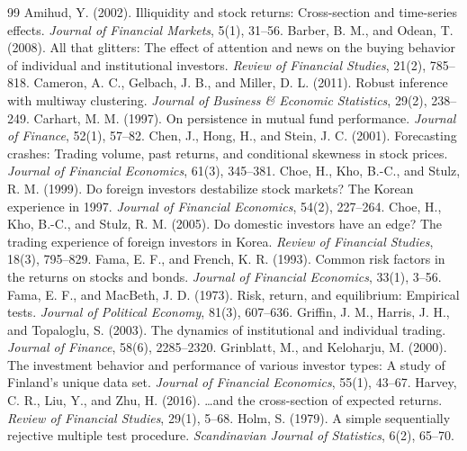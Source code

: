 \documentclass[11pt]{article}
\begin{document}
\begin{thebibliography}{99}\small
{} Amihud, Y. (2002). Illiquidity and stock returns: Cross-section and time-series effects. \textit{Journal of Financial Markets}, 5(1), 31--56.
 Barber, B. M., and Odean, T. (2008). All that glitters: The effect of attention and news on the buying behavior of individual and institutional investors. \textit{Review of Financial Studies}, 21(2), 785--818.
 Cameron, A. C., Gelbach, J. B., and Miller, D. L. (2011). Robust inference with multiway clustering. \textit{Journal of Business \& Economic Statistics}, 29(2), 238--249.
 Carhart, M. M. (1997). On persistence in mutual fund performance. \textit{Journal of Finance}, 52(1), 57--82.
 Chen, J., Hong, H., and Stein, J. C. (2001). Forecasting crashes: Trading volume, past returns, and conditional skewness in stock prices. \textit{Journal of Financial Economics}, 61(3), 345--381.
 Choe, H., Kho, B.-C., and Stulz, R. M. (1999). Do foreign investors destabilize stock markets? The Korean experience in 1997. \textit{Journal of Financial Economics}, 54(2), 227--264.
 Choe, H., Kho, B.-C., and Stulz, R. M. (2005). Do domestic investors have an edge? The trading experience of foreign investors in Korea. \textit{Review of Financial Studies}, 18(3), 795--829.
 Fama, E. F., and French, K. R. (1993). Common risk factors in the returns on stocks and bonds. \textit{Journal of Financial Economics}, 33(1), 3--56.
 Fama, E. F., and MacBeth, J. D. (1973). Risk, return, and equilibrium: Empirical tests. \textit{Journal of Political Economy}, 81(3), 607--636.
 Griffin, J. M., Harris, J. H., and Topaloglu, S. (2003). The dynamics of institutional and individual trading. \textit{Journal of Finance}, 58(6), 2285--2320.
 Grinblatt, M., and Keloharju, M. (2000). The investment behavior and performance of various investor types: A study of Finland's unique data set. \textit{Journal of Financial Economics}, 55(1), 43--67.
 Harvey, C. R., Liu, Y., and Zhu, H. (2016). \ldots and the cross-section of expected returns. \textit{Review of Financial Studies}, 29(1), 5--68.
 Holm, S. (1979). A simple sequentially rejective multiple test procedure. \textit{Scandinavian Journal of Statistics}, 6(2), 65--70.

\end{thebibliography}
\end{document}
